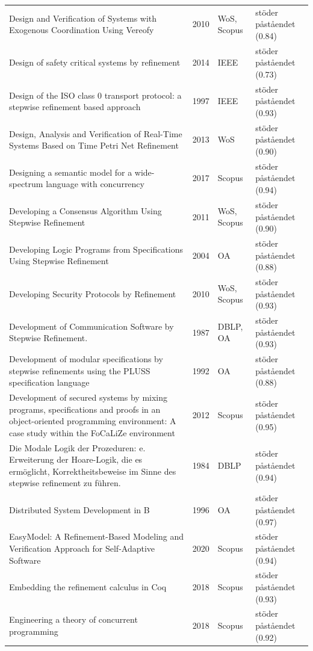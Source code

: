 \begin{longtable}{@{}%
  >{\raggedright\arraybackslash}p{}c%
  >{\raggedright\arraybackslash}p{}%
  >{\raggedright\arraybackslash}p{}@{}}
Design and Verification of Systems with Exogenous Coordination Using Vereofy & 2010 & WoS, Scopus & stöder påståendet (0.84) \\
Design of safety critical systems by refinement & 2014 & IEEE & stöder påståendet (0.73) \\
Design of the ISO class 0 transport protocol: a stepwise refinement based approach & 1997 & IEEE & stöder påståendet (0.93) \\
Design, Analysis and Verification of Real-Time Systems Based on Time Petri Net Refinement & 2013 & WoS & stöder påståendet (0.90) \\
Designing a semantic model for a wide-spectrum language with concurrency & 2017 & Scopus & stöder påståendet (0.94) \\
Developing a Consensus Algorithm Using Stepwise Refinement & 2011 & WoS, Scopus & stöder påståendet (0.90) \\
Developing Logic Programs from Specifications Using Stepwise Refinement & 2004 & OA & stöder påståendet (0.88) \\
Developing Security Protocols by Refinement & 2010 & WoS, Scopus & stöder påståendet (0.93) \\
Development of Communication Software by Stepwise Refinement. & 1987 & DBLP, OA & stöder påståendet (0.93) \\
Development of modular specifications by stepwise refinements using the PLUSS specification language & 1992 & OA & stöder påståendet (0.88) \\
Development of secured systems by mixing programs, specifications and proofs in an object-oriented programming environment: A case study within the FoCaLiZe environment & 2012 & Scopus & stöder påståendet (0.95) \\
Die \textquotedbl{}Modale Logik der Prozeduren\textquotedbl{}: e. Erweiterung der Hoare-Logik, die es ermöglicht, Korrektheitsbeweise im Sinne des \textquotedbl{}stepwise refinement\textquotedbl{} zu führen. & 1984 & DBLP & stöder påståendet (0.94) \\
Distributed System Development in B & 1996 & OA & stöder påståendet (0.97) \\
EasyModel: A Refinement-Based Modeling and Verification Approach for Self-Adaptive Software & 2020 & Scopus & stöder påståendet (0.94) \\
Embedding the refinement calculus in Coq & 2018 & Scopus & stöder påståendet (0.93) \\
Engineering a theory of concurrent programming & 2018 & Scopus & stöder påståendet (0.92) \\

\end{longtable}
